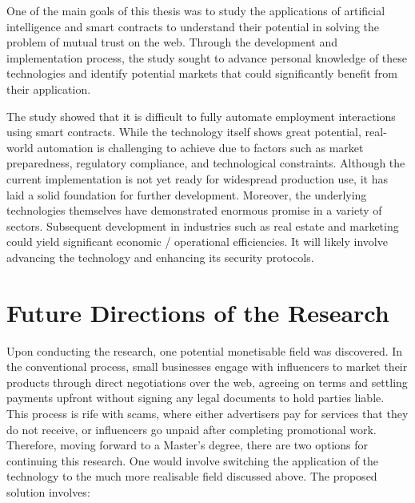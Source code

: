 One of the main goals of this thesis was to study the applications of artificial intelligence and smart contracts to understand their potential in solving the problem of mutual trust on the web. Through the development and implementation process, the study sought to advance personal knowledge of these technologies and identify potential markets that could significantly benefit from their application.

The study showed that it is difficult to fully automate employment interactions using smart contracts. While the technology itself shows great potential, real-world automation is challenging to achieve due to factors such as market preparedness, regulatory compliance, and technological constraints. Although the current implementation is not yet ready for widespread production use, it has laid a solid foundation for further development. Moreover, the underlying technologies themselves have demonstrated enormous promise in a variety of sectors. Subsequent development in industries such as real estate and marketing could yield significant economic / operational efficiencies. It will likely involve advancing the technology and enhancing its security protocols.

\section{Future Directions of the Research}

Upon conducting the research, one potential monetisable field was discovered. In the conventional process, small businesses engage with influencers to market their products through direct negotiations over the web, agreeing on terms and settling payments upfront without signing any legal documents to hold parties liable. This process is rife with scams, where either advertisers pay for services that they do not receive, or influencers go unpaid after completing promotional work. Therefore, moving forward to a Master's degree, there are two options for continuing this research. One would involve switching the application of the technology to the much more realisable field discussed above. The proposed solution involves:

